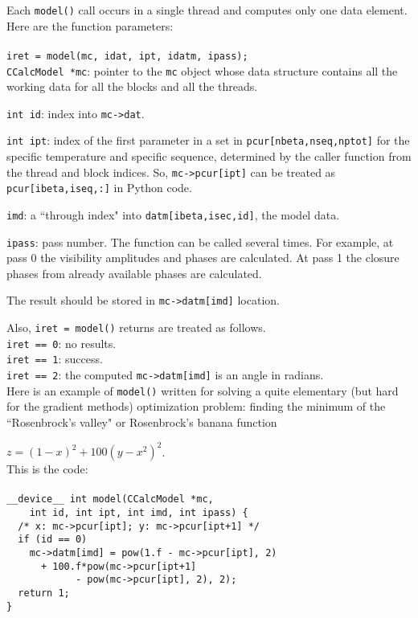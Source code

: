 \documentclass[preprint2]{aastex}
\begin{document}
Each \verb|model()| call occurs in a single thread and computes only one data element. Here are the function parameters: \\ \\
\verb|iret = model(mc, idat, ipt, idatm, ipass);| \\

\verb|CCalcModel *mc|: pointer to the \verb|mc| object whose data structure contains all the working data for all the blocks and all the threads.

\verb|int id|: index into \verb|mc->dat|.

\verb|int ipt|: index of the first parameter in a set in \verb|pcur[nbeta,nseq,nptot]| for the specific temperature and specific sequence, determined by the caller function from the thread and block indices. So, \verb|mc->pcur[ipt]| can be treated as \verb|pcur[ibeta,iseq,:]| in Python code.

\verb|imd|: a ``through index" into \verb|datm[ibeta,isec,id]|, the model data.  

\verb|ipass|: pass number. The function can be called several times. For example, at pass 0 the visibility amplitudes and phases are calculated. At pass 1 the closure phases from already available phases are calculated. 

The result should be stored in \verb|mc->datm[imd]| location.

Also, \verb|iret = model()| returns are treated as follows. \\
\verb|iret == 0|: no results. \\
\verb|iret == 1|: success. \\
\verb|iret == 2|: the computed \verb|mc->datm[imd]| is an angle in radians. \\

Here is an example of \verb|model()| written for solving a quite elementary (but hard for the gradient methods) optimization problem: finding the minimum of the ``Rosenbrock's valley" or Rosenbrock's banana function 

$z = (1 - x)^2 + 100(y - x^2)^2$. \\

This is the code: \\ \\
\verb|__device__ int model(CCalcModel *mc, | \\
\verb|    int id, int ipt, int imd, int ipass) {| \\
\verb|  /* x: mc->pcur[ipt]; y: mc->pcur[ipt+1] */| \\
\verb|  if (id == 0)| \\
\verb|    mc->datm[imd] = pow(1.f - mc->pcur[ipt], 2)| \\
\verb|      + 100.f*pow(mc->pcur[ipt+1]| \\ 
\verb|            - pow(mc->pcur[ipt], 2), 2);| \\
\verb|  return 1;|\\
\verb|}|
\end{document}
